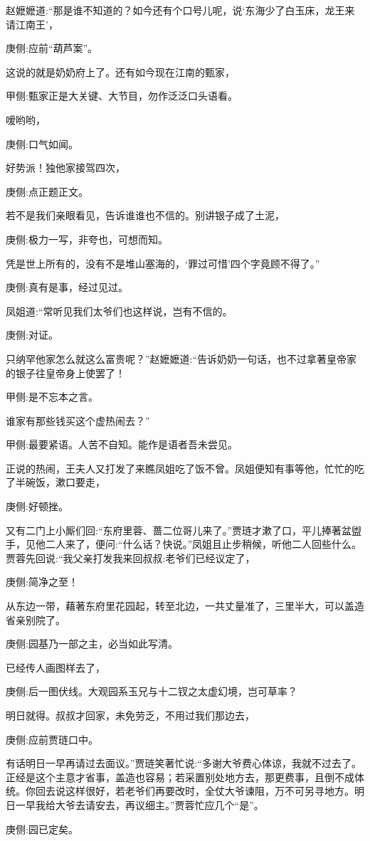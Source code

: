 \begin{parag}
    赵嬷嬷道:“那是谁不知道的？如今还有个口号儿呢，说‘东海少了白玉床，龙王来请江南王’，\begin{note}庚侧:应前“葫芦案”。\end{note}这说的就是奶奶府上了。还有如今现在江南的甄家，\begin{note}甲侧:甄家正是大关键、大节目，勿作泛泛口头语看。\end{note}嗳哟哟，\begin{note}庚侧:口气如闻。\end{note}好势派！独他家接驾四次，\begin{note}庚侧:点正题正文。\end{note}若不是我们亲眼看见，告诉谁谁也不信的。别讲银子成了土泥，\begin{note}庚侧:极力一写，非夸也，可想而知。\end{note}凭是世上所有的，没有不是堆山塞海的，‘罪过可惜’四个字竟顾不得了。”\begin{note}庚侧:真有是事，经过见过。\end{note}凤姐道:“常听见我们太爷们也这样说，岂有不信的。\begin{note}庚侧:对证。\end{note}只纳罕他家怎么就这么富贵呢？”赵嬷嬷道:“告诉奶奶一句话，也不过拿著皇帝家的银子往皇帝身上使罢了！\begin{note}甲侧:是不忘本之言。\end{note}谁家有那些钱买这个虚热闹去？”\begin{note}甲侧:最要紧语。人苦不自知。能作是语者吾未尝见。\end{note}
\end{parag}


\begin{parag}
    正说的热闹，王夫人又打发了来瞧凤姐吃了饭不曾。凤姐便知有事等他，忙忙的吃了半碗饭，漱口要走，\begin{note}庚侧:好顿挫。\end{note}又有二门上小厮们回:“东府里蓉、蔷二位哥儿来了。”贾琏才漱了口，平儿捧著盆盥手，见他二人来了，便问:“什么话？快说。”凤姐且止步稍候，听他二人回些什么。贾蓉先回说:“我父亲打发我来回叔叔:老爷们已经议定了，\begin{note}庚侧:简净之至！\end{note}从东边一带，藉著东府里花园起，转至北边，一共丈量准了，三里半大，可以盖造省亲别院了。\begin{note}庚侧:园基乃一部之主，必当如此写清。\end{note}已经传人画图样去了，\begin{note}庚侧:后一图伏线。大观园系玉兄与十二钗之太虚幻境，岂可草率？\end{note}明日就得。叔叔才回家，未免劳乏，不用过我们那边去，\begin{note}庚侧:应前贾琏口中。\end{note}有话明日一早再请过去面议。”贾琏笑著忙说:“多谢大爷费心体谅，我就不过去了。正经是这个主意才省事，盖造也容易；若采置别处地方去，那更费事，且倒不成体统。你回去说这样很好，若老爷们再要改时，全仗大爷谏阻，万不可另寻地方。明日一早我给大爷去请安去，再议细主。”贾蓉忙应几个“是”。\begin{note}庚侧:园已定矣。\end{note}
\end{parag}


